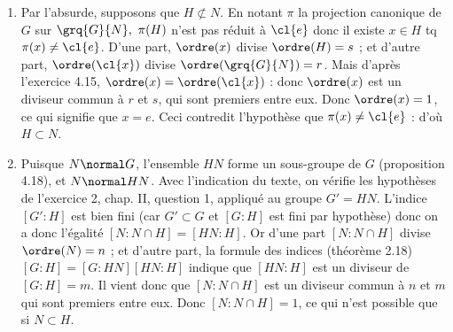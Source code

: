 
\begin{enumerate}
    \item Par l'absurde, supposons que $H \not\subset N$. En notant $\pi$ la projection canonique de $G$ sur $\grq{G}{N},~ \pi(H) $ n'est pas réduit à $\cl{e}$ donc 
    il existe $x\in H$ tq $\pi(x) \neq \cl{e}$. D'une part, $\ordre(x)$ divise $\ordre(H) = s$ ; et d'autre part, $\ordre(\cl{x})$ divise $\ordre(\grq{G}{N}) = r$. 
    Mais d'après l'exercice 4.15, $\ordre(x) = \ordre(\cl{x})$ : donc $\ordre(x)$ est un diviseur commun à $r$ et $s$, qui sont premiers entre eux. Donc $\ordre(x) = 1$, ce qui 
    signifie que $x=e$. Ceci contredit l'hypothèse que $\pi(x) \neq \cl{e}$ : d'où $H \subset N$. 

    \item Puisque $N \normal G$, l'ensemble $HN$ forme un sous-groupe de $G$ (proposition 4.18), et $N \normal HN$. Avec l'indication du texte, 
    on vérifie les hypothèses de l'exercice 2, chap. II, question 1, appliqué au groupe $G' = HN$. L'indice $[G':H]$ est bien fini (car $G'\subset G$ et $[G:H]$ est fini par hypothèse) donc 
    on a donc l'égalité $[N:N\cap H] = [HN:H]$. Or d'une part $[N:N\cap H]$ divise $\ordre(N) = n$ ; et d'autre part, la formule des indices (théorème 2.18) $[G:H] = [G:HN] [HN:H]$ indique que $[HN:H]$
    est un diviseur de $[G:H] = m$. Il vient donc que $[N:N\cap H]$ est un diviseur commun à $n$ et $m$ qui sont premiers entre eux. Donc $[N:N\cap H] = 1$, ce qui n'est possible que si $N\subset H$. 
\end{enumerate}